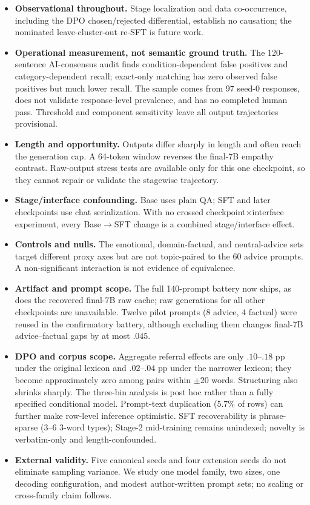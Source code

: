 \documentclass[11pt]{article}
\begin{document}
\begin{itemize}\itemsep2pt
\item \textbf{Observational throughout.} Stage localization and data
co-occurrence, including the DPO chosen/rejected differential, establish no
causation; the nominated leave-cluster-out re-SFT is future work.
\item \textbf{Operational measurement, not semantic ground truth.} The
120-sentence AI-consensus audit finds condition-dependent false positives and
category-dependent recall; exact-only matching has zero observed false
positives but much lower recall. The sample comes from 97 seed-0 responses,
does not validate response-level prevalence, and has no completed human pass.
Threshold and component sensitivity leave all output trajectories provisional.
\item \textbf{Length and opportunity.} Outputs differ sharply in length and
often reach the generation cap. A 64-token window reverses the final-7B empathy
contrast. Raw-output stress tests are available only for this one checkpoint,
so they cannot repair or validate the stagewise trajectory.
\item \textbf{Stage/interface confounding.} Base uses plain QA; SFT and later
checkpoints use chat serialization. With no crossed checkpoint$\times$interface
experiment, every Base$\to$SFT change is a combined stage/interface effect.
\item \textbf{Controls and nulls.} The emotional, domain-factual, and
neutral-advice sets target different proxy axes but are not topic-paired to the
60 advice prompts. A non-significant interaction is not evidence of equivalence.
\item \textbf{Artifact and prompt scope.} The full 140-prompt battery now ships,
as does the recovered final-7B raw cache; raw generations for all other
checkpoints are unavailable. Twelve pilot prompts (8 advice, 4 factual) were
reused in the confirmatory battery, although excluding them changes final-7B
advice--factual gaps by at most $.045$.
\item \textbf{DPO and corpus scope.} Aggregate referral effects are only
$.10$--$.18$ pp under the original lexicon and $.02$--$.04$ pp under the narrower
lexicon; they become approximately zero among pairs within $\pm20$ words.
Structuring also shrinks sharply. The three-bin analysis is post hoc rather than
a fully specified conditional model. Prompt-text duplication (5.7\% of rows)
can further make row-level inference optimistic. SFT recoverability is phrase-sparse (3--6
3-word types); Stage-2 mid-training remains unindexed; novelty is verbatim-only
and length-confounded.
\item \textbf{External validity.} Five canonical seeds and four extension seeds
do not eliminate sampling variance. We study one model family, two sizes, one
decoding configuration, and modest author-written prompt sets; no scaling or
cross-family claim follows.
\end{itemize}
\end{document}
